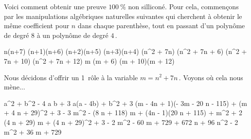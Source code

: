 \begin{remark} \label{no-silicon}
	Voici comment obtenir une preuve $\qty{100}{\percent}$ non silliconé.
	Pour cela, commençons par les manipulations algébriques naturelles suivantes qui cherchent à obtenir le même coefficient pour $n$ dans chaque parenthèse, tout en passant d'un polynôme de degré $8$ à un polynôme de degré $4$\,.
    
    \medskip
    \begin{stepcalc}[style = sar]
    \explnext{}
    	n(n+7) \cdot (n+1)(n+6) \cdot (n+2)(n+5) \cdot (n+3)(n+4)
    \explnext{}
    	(n^2 + 7n) \cdot (n^2 + 7n + 6) \cdot (n^2 + 7n + 10) \cdot (n^2 + 7n + 12)
    	m (m + 6) (m + 10)(m + 12)
    \end{stepcalc}
    
    \medskip
    Nous décidons d'offrir un 1\ier\ rôle à la variable $m = n^2 + 7n$\,. Voyons où cela nous mène...
    
	\medskip
    \noindent\kern-10pt%
	\begin{stepcalc}[style = ar*, ope={=}]
    	a^2 + b^2 - 4 a b + 3
    \explnext{}
    	a(a - 4b) + b^2 + 3
    	(m - 4n + 1)(- 3m - 20 n - 115) 
		+
		(m + 4 n + 29)^2
		+
		3
    \explnext{}
    	- 3 m^2 - (8 n + 118) m + (4n - 1)(20 n + 115)
		+
		m^2 + 2 (4 n + 29) m
		+
		(4 n + 29)^2
		+
		3
    \explnext{}
    	- 2 m^2
		- 60 m 
		+
		729 + 672 n + 96 n^2
    	- 2 m^2 + 36 m + 729
    \end{stepcalc}
\end{remark}
